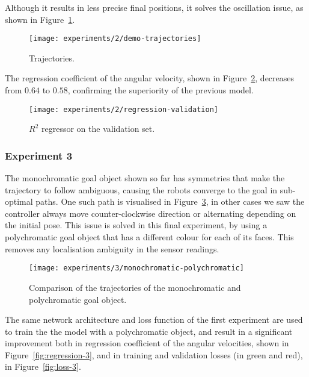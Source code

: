  
Although it results in less precise final positions, it solves the oscillation 
issue, as shown in Figure~\ref{fig:demo-trajectories}.

\begin{figure}[htbp]
	\centerline{\texttt{[image: experiments/2/demo-trajectories]}}
	\caption{Trajectories.}
	\label{fig:demo-trajectories}
\end{figure}

The regression coefficient of the angular velocity, shown in 
Figure~\ref{fig:regression-validation}, decreases from $0.64$ to $0.58$, 
confirming the superiority of the previous model.

\begin{figure}[htbp]
	\centerline{\texttt{[image: experiments/2/regression-validation]}}
	\caption{$R^2$ regressor on the validation set.}
	\label{fig:regression-validation}
\end{figure}

\subsubsection{Experiment 3}
\label{experiment3}

The monochromatic goal object shown so far has symmetries that make the 
trajectory to follow ambiguous, causing the robots converge to the goal in 
sub-optimal paths. One such path is visualised in 
Figure~\ref{fig:demo-circle-trajectories}, in other cases we saw the controller 
always move counter-clockwise direction or alternating depending on the 
initial pose.
This issue is solved in this final experiment, by using a polychromatic goal 
object that has a different colour for each of its faces. This removes any 
localisation ambiguity in the sensor readings.

\begin{figure}[htbp]
	\centerline{\texttt{[image: experiments/3/monochromatic-polychromatic]}}
	\caption{Comparison of the trajectories of the monochromatic and 
	polychromatic goal object.}
	\label{fig:demo-circle-trajectories}
\end{figure}

The same network architecture and loss function of the first experiment are 
used to train the the model with a polychromatic object, and result in a 
significant improvement both in regression coefficient of the angular 
velocities, shown in Figure~\ref{fig:regression-3}, and in training and 
validation losses (in green and red), in Figure~\ref{fig:loss-3}.

